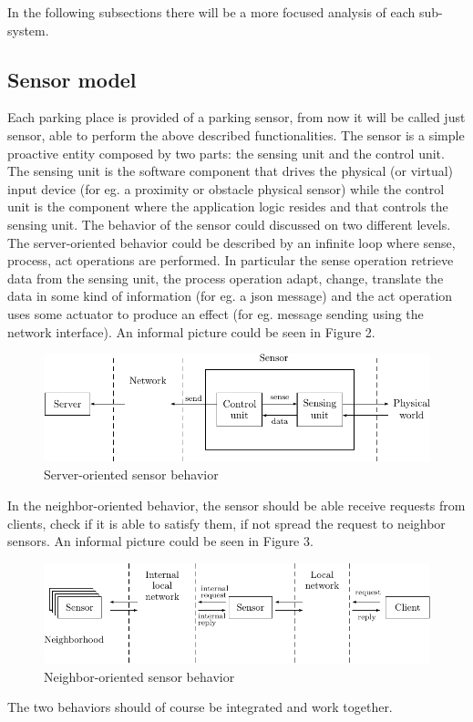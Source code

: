 \documentclass[11pt]{article}
\begin{document}
In the following subsections there will be a more focused analysis of each sub-system.
\subsection{Sensor model}
Each parking place is provided of a parking sensor, from now it will be called just sensor, able to perform the above described functionalities. The sensor is a simple proactive entity composed by two parts: the sensing unit and the control unit. The sensing unit is the software component that drives the physical (or virtual) input device (for eg. a proximity or obstacle physical sensor) while the control unit is the component where the application logic resides and that controls the sensing unit. The behavior of the sensor could discussed on two different levels. The server-oriented behavior could be described by an infinite loop where sense, process, act operations are performed. In particular the sense operation retrieve data from the sensing unit, the process operation adapt, change, translate the data in some kind of information (for eg. a json message) and the act operation uses some actuator to produce an effect (for eg. message sending using the network interface). An informal picture could be seen in Figure 2.

\begin{figure}
  \centering
	\includegraphics[scale=1]{sensor_server_oriented_behavior}
  \caption{Server-oriented sensor behavior}
\end{figure}
In the neighbor-oriented behavior, the sensor should be able receive requests from clients, check if it is able to satisfy them, if not spread the request to neighbor sensors. An informal picture could be seen in Figure 3.
\begin{figure}
  \centering
	\includegraphics[scale=1]{sensor_neighbor_oriented_behavior}
  \caption{Neighbor-oriented sensor behavior}
\end{figure}
The two behaviors should of course be integrated and work together.
\end{document}

